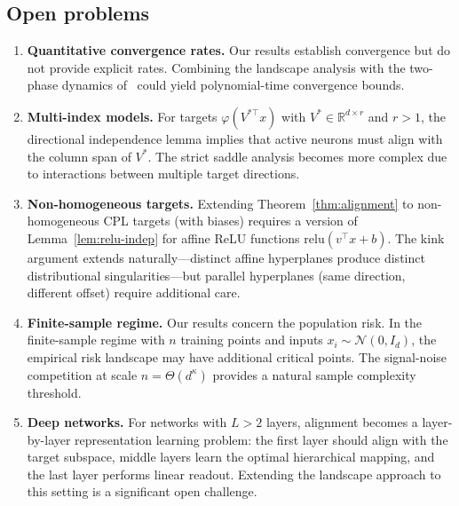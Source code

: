 \documentclass[11pt]{amsart}
\theoremstyle{definition}
\newcommand{\R}{\mathbb{R}}
\newcommand{\relu}{\mathrm{relu}}
\begin{document}
\subsection{Open problems}

\begin{enumerate}[label=(\arabic*)]
\item \textbf{Quantitative convergence rates.} Our results establish convergence but do not provide explicit rates.  Combining the landscape analysis with the two-phase dynamics of~\cite{bietti2022} could yield polynomial-time convergence bounds.

\item \textbf{Multi-index models.} For targets $\varphi(V^{*\top}x)$ with $V^* \in \R^{d \times r}$ and $r > 1$, the directional independence lemma implies that active neurons must align with the column span of $V^*$. The strict saddle analysis becomes more complex due to interactions between multiple target directions.

\item \textbf{Non-homogeneous targets.} Extending Theorem~\ref{thm:alignment} to non-homogeneous CPL targets (with biases) requires a version of Lemma~\ref{lem:relu-indep} for affine ReLU functions $\relu(v^\top x + b)$. The kink argument extends naturally---distinct affine hyperplanes produce distinct distributional singularities---but parallel hyperplanes (same direction, different offset) require additional care.

\item \textbf{Finite-sample regime.} Our results concern the population risk. In the finite-sample regime with $n$ training points and inputs $x_i \sim \mathcal{N}(0, I_d)$, the empirical risk landscape may have additional critical points. The signal-noise competition at scale $n = \Theta(d^\kappa)$ provides a natural sample complexity threshold.

\item \textbf{Deep networks.} For networks with $L > 2$ layers, alignment becomes a layer-by-layer representation learning problem: the first layer should align with the target subspace, middle layers learn the optimal hierarchical mapping, and the last layer performs linear readout. Extending the landscape approach to this setting is a significant open challenge.
\end{enumerate}

\end{document}

